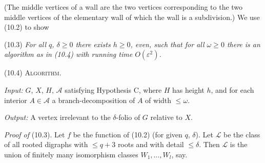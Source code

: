 (The middle vertices of a wall are the two vertices corresponding to the two middle vertices of the elementary wall of which the wall is a subdivision.) We use (10.2) to show

\stmt
(10.3) \textit{For all $q$, $\delta \ge 0$ there exists $h \ge 0$, even, such that for all $\omega \ge 0$ there is an algorithm as in (10.4) with running time $O(\varepsilon^2)$.}

\stmt
(10.4) \textsc{Algorithm}.

\textit{Input:} $G$, $X$, $H$, $\mathcal{A}$ satisfying Hypothesis C, where $H$ has height $h$, and for each interior $A \in \mathcal{A}$ a branch-decomposition of $A$ of width $\le \omega$.

\textit{Output:} A vertex irrelevant to the $\delta$-folio of $G$ relative to $X$.

\textit{Proof of} (10.3). Let $f$ be the function of (10.2) (for given $q$, $\delta$). Let $\mathcal{L}$ be the class of all rooted digraphs with $\le q+3$ roots and with detail $\le \delta$. Then $\mathcal{L}$ is the union of finitely many isomorphism classes $W_1, \dots, W_l$, say.
